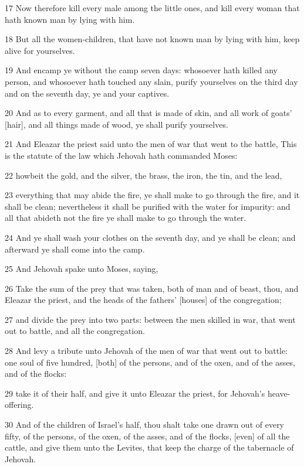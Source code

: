 \par 17 Now therefore kill every male among the little ones, and kill every woman that hath known man by lying with him.
\par 18 But all the women-children, that have not known man by lying with him, keep alive for yourselves.
\par 19 And encamp ye without the camp seven days: whosoever hath killed any person, and whosoever hath touched any slain, purify yourselves on the third day and on the seventh day, ye and your captives.
\par 20 And as to every garment, and all that is made of skin, and all work of goats' [hair], and all things made of wood, ye shall purify yourselves.
\par 21 And Eleazar the priest said unto the men of war that went to the battle, This is the statute of the law which Jehovah hath commanded Moses:
\par 22 howbeit the gold, and the silver, the brass, the iron, the tin, and the lead,
\par 23 everything that may abide the fire, ye shall make to go through the fire, and it shall be clean; nevertheless it shall be purified with the water for impurity: and all that abideth not the fire ye shall make to go through the water.
\par 24 And ye shall wash your clothes on the seventh day, and ye shall be clean; and afterward ye shall come into the camp.
\par 25 And Jehovah spake unto Moses, saying,
\par 26 Take the sum of the prey that was taken, both of man and of beast, thou, and Eleazar the priest, and the heads of the fathers' [houses] of the congregation;
\par 27 and divide the prey into two parts: between the men skilled in war, that went out to battle, and all the congregation.
\par 28 And levy a tribute unto Jehovah of the men of war that went out to battle: one soul of five hundred, [both] of the persons, and of the oxen, and of the asses, and of the flocks:
\par 29 take it of their half, and give it unto Eleazar the priest, for Jehovah's heave-offering.
\par 30 And of the children of Israel's half, thou shalt take one drawn out of every fifty, of the persons, of the oxen, of the asses, and of the flocks, [even] of all the cattle, and give them unto the Levites, that keep the charge of the tabernacle of Jehovah.
